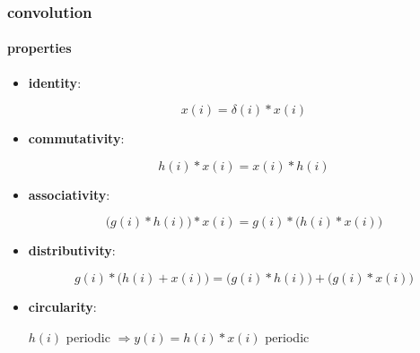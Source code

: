         \begin{frame}\frametitle{convolution}\framesubtitle{properties}
            \begin{itemize}
                \item<1->	\textbf{identity}:
                        \begin{footnotesize}\begin{equation*}
                            x(i) = \delta(i)\ast x(i)
                        \end{equation*}\end{footnotesize}
                \item<2->	\textbf{commutativity}: 
                        \begin{footnotesize}\begin{equation*}
                            h(i) \ast x(i)	= x(i) \ast h(i) 
                        \end{equation*}\end{footnotesize}
                \item<3->	\textbf{associativity}:
                        \begin{footnotesize}\begin{equation*}
                            \big(g(i) \ast h(i)\big) \ast x(i) = g(i) \ast \big(h(i) \ast x(i)\big)
                        \end{equation*}\end{footnotesize}
                \item<4->	\textbf{distributivity}:
                            \begin{footnotesize}\begin{equation*}
                                g(i) \ast \big(h(i) + x(i)\big) = \big(g(i) \ast h(i)\big) + \big(g(i) \ast x(i)\big)
                            \end{equation*}\end{footnotesize}
                \item<5->	\textbf{circularity}:\\
                        \begin{footnotesize}
                        $h(i)$ periodic $\Rightarrow y(i) = h(i) \ast x(i)$ periodic
                        \end{footnotesize}
            \end{itemize}
        \end{frame}	

